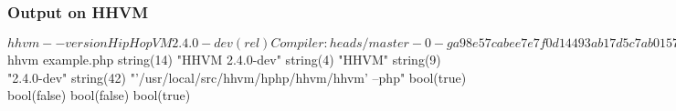 \subsubsection*{Output on H\+H\+VM}

\begin{DoxyVerb}$ hhvm --version
HipHop VM 2.4.0-dev (rel)
Compiler: heads/master-0-ga98e57cabee7e7f0d14493ab17d5c7ab0157eb98
Repo schema: 8d6e69287c41c1f09bb4d327421720d1922cfc67


$ hhvm example.php
string(14) "HHVM 2.4.0-dev"
string(4) "HHVM"
string(9) "2.4.0-dev"
string(42) "'/usr/local/src/hhvm/hphp/hhvm/hhvm' --php"
bool(true)
bool(false)
bool(false)
bool(true)\end{DoxyVerb}
 